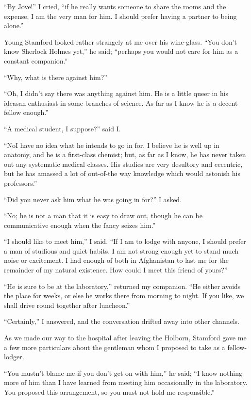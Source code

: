 \documentclass[12pt,english]{book}
\begin{document}
{}``By Jove!'' I cried, {}``if he really wants someone to share
the rooms and the expense, I am the very man for him. I should prefer
having a partner to being alone.''

Young Stamford looked rather strangely at me over his wine-glass.
{}``You don't know Sherlock Holmes yet,'' he said; {}``perhaps
you would not care for him as a constant companion.''

{}``Why, what is there against him?''

{}``Oh, I didn't say there was anything against him. He is a little
queer in his ideas\mdsh{---}an enthusiast in some branches of science.
As far as I know he is a decent fellow enough.''

{}``A medical student, I suppose?'' said I.

{}``No\mdsh{---}I have no idea what he intends to go in for. I believe
he is well up in anatomy, and he is a first-class chemist; but, as
far as I know, he has never taken out any systematic medical classes.
His studies are very desultory and eccentric, but he has amassed a
lot of out-of-the way knowledge which would astonish his professors.''

{}``Did you never ask him what he was going in for?'' I asked.

{}``No; he is not a man that it is easy to draw out, though he can
be communicative enough when the fancy seizes him.''

{}``I should like to meet him,'' I said. {}``If I am to lodge with
anyone, I should prefer a man of studious and quiet habits. I am not
strong enough yet to stand much noise or excitement. I had enough
of both in Afghanistan to last me for the remainder of my natural
existence. How could I meet this friend of yours?''

{}``He is sure to be at the laboratory,'' returned my companion.
{}``He either avoids the place for weeks, or else he works there
from morning to night. If you like, we shall drive round together
after luncheon.''

{}``Certainly,'' I answered, and the conversation drifted away into
other channels.

As we made our way to the hospital after leaving the Holborn, Stamford
gave me a few more particulars about the gentleman whom I proposed
to take as a fellow-lodger.

{}``You mustn't blame me if you don't get on with him,'' he said;
{}``I know nothing more of him than I have learned from meeting him
occasionally in the laboratory. You proposed this arrangement, so
you must not hold me responsible.''
\end{document}
